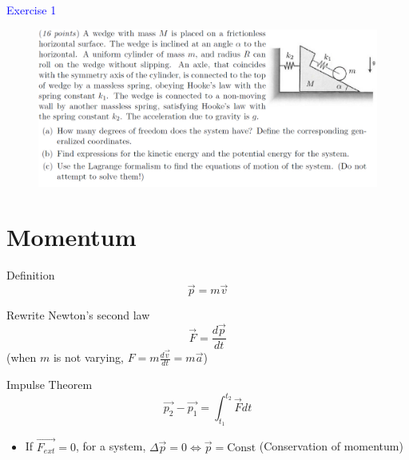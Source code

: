 \documentclass{beamer}
\begin{document}
\begin{frame}
\textcolor{blue}{Exercise 1}

\begin{figure}[htbp]
\centering
\includegraphics[width=1 \linewidth, angle =0]{ex1.png}
\label{fig:2}
\end{figure}
\end{frame}

\section{Momentum}
\begin{frame}
  \begin{block}{Definition}
    $$\vec{p} = m\vec{v}$$
  \end{block}
  \begin{block}{Rewrite Newton's second law}
    $$\vec{F}=\frac{d\vec{p}}{dt}$$ (when $m$ is not varying, $F = m\frac{d\vec{v}}{dt}=m\vec{a}$)
  \end{block}
  \begin{block}{Impulse Theorem}
    $$\vec{p_2}-\vec{p_1}=\int_{t_1}^{t_2}\vec{F}dt$$
  \end{block}
  \begin{itemize}
    \item If $\vec{F_{ext}} = 0$, for a system, $\Delta\vec{p} = 0 \Leftrightarrow \vec{p} = \text{Const}$ (Conservation of momentum)
  \end{itemize}
\end{frame}
\end{document}
